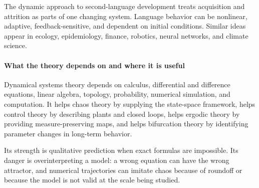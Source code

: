 The dynamic approach to second-language development treats acquisition and attrition as parts of one changing system. Language behavior can be nonlinear, adaptive, feedback-sensitive, and dependent on initial conditions. Similar ideas appear in ecology, epidemiology, finance, robotics, neural networks, and climate science.

\paragraph{What the theory depends on and where it is useful}

Dynamical systems theory depends on calculus, differential and difference equations, linear algebra, topology, probability, numerical simulation, and computation. It helps chaos theory by supplying the state-space framework, helps control theory by describing plants and closed loops, helps ergodic theory by providing measure-preserving maps, and helps bifurcation theory by identifying parameter changes in long-term behavior.

Its strength is qualitative prediction when exact formulas are impossible. Its danger is overinterpreting a model: a wrong equation can have the wrong attractor, and numerical trajectories can imitate chaos because of roundoff or because the model is not valid at the scale being studied.

